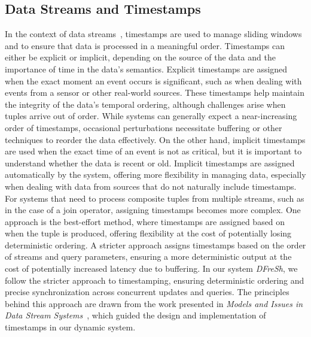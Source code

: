 \documentclass[a4paper,11pt,twoside,openany]{book}
\begin{document}
\subsection{Data Streams and Timestamps}
In the context of data streams~\cite{}, timestamps are used to manage sliding windows and to
ensure that data is processed in a meaningful order. Timestamps can either be explicit
or implicit, depending on the source of the data and the importance of time in the data's
semantics. Explicit timestamps are assigned when the exact moment an event occurs is
significant, such as when dealing with events from a sensor or other real-world sources.
These timestamps help maintain the integrity of the data's temporal ordering, although
challenges arise when tuples arrive out of order. While systems can generally expect a
near-increasing order of timestamps, occasional perturbations necessitate buffering
or other techniques to reorder the data effectively.
% 
On the other hand, implicit timestamps are used when the exact time of an event is not
as critical, but it is important to understand whether the data is recent or old.
Implicit timestamps are assigned automatically by the system, offering more flexibility
in managing data, especially when dealing with data from sources that do not naturally
include timestamps.
% 
For systems that need to process composite tuples from multiple streams, such as in the
case of a join operator, assigning timestamps becomes more complex. One approach is the
best-effort method, where timestamps are assigned based on when the tuple is produced,
offering flexibility at the cost of potentially losing deterministic ordering. A stricter
approach assigns timestamps based on the order of streams and query parameters,
ensuring a more deterministic output at the cost of potentially increased latency
due to buffering.
% 
In our system \textit{DFreSh}, we follow the stricter approach to timestamping, ensuring deterministic
ordering and precise synchronization across concurrent updates and queries.
The principles behind this approach are drawn from the work presented 
in \textit{Models and Issues in Data Stream Systems}~\cite{},
which guided the design and implementation of timestamps in our dynamic system.


























\cleardoublepage
{}

\end{document}
